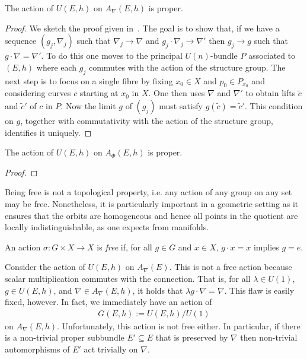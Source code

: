 \documentclass[12pt]{ociamthesis}  %
\begin{document}
\begin{example}\label{ex:h_proper_action}
  The action of $U(E,h)$ on $A_\nabla(E,h)$ is proper.
  \begin{proof}
    We sketch the proof given in~\cite[{Proposition 7.1.14}]{kobayashi1987}.
    The goal is to show that, if we have a sequence $(g_j,\nabla_j)$
    such that $\nabla_j\to\nabla$ and $g_j\cdot\nabla_j\to\nabla'$
    then $g_j\to g$ such that $g\cdot\nabla = \nabla'$. To do this
    one moves to the principal $U(n)$-bundle $P$ associated to $(E,h)$
    where each $g_j$ commutes with the action of the structure
    group. The next step is to focus on a single fibre by fixing $x_0\in X$ and
    $p_0\in P_{x_0}$ and considering curves $c$ starting at $x_0$ in $X$.
    One then uses $\nabla$ and $\nabla'$ to obtain lifts $\tilde c$ and
    $\tilde c'$ of $c$ in $P$. Now the limit $g$ of $(g_j)$ must satisfy
    $g(\tilde c) = \tilde c'$. This condition on $g$, together with
    commutativity with the action of the structure group, identifies it
    uniquely.
  \end{proof}
\end{example}

\begin{example}\label{ex:higgs_proper_action}
  The action of $U(E,h)$ on $A_\Phi (E,h)$ is proper.
  \begin{proof}
    \missingproof
  \end{proof}
\end{example}

Being free is not a topological property, i.e. any action of any group on any
set may be free. Nonetheless, it is particularly important in a geometric
setting as it ensures that the orbits are homogeneous and hence all points in
the quotient are locally indistinguishable, as one expects from manifolds.

\begin{definition}
  An action $\sigma : G\times X\to X$ is \emph{free} if, for all
  $g\in G$ and $x\in X$, $g\cdot x = x$ implies $g = e$.
\end{definition}

\begin{example}\label{ex:not_free}
  Consider the action of $U(E,h)$ on $A_\nabla(E)$. This is not a free action
  because scalar multiplication commutes with the connection. That is,
  for all $\lambda\in U(1)$, $g\in U(E,h)$, and $\nabla\in A_\nabla(E,h)$,
  it holds that $\lambda g\cdot \nabla = \nabla$. This flaw is easily fixed,
  however. In fact, we immediately have an action of
  \begin{align*}
    G(E,h) := U(E,h) / U(1)
  \end{align*}
  on $A_\nabla(E,h)$. Unfortunately, this action is not free either. In particular,
  if there is a non-trivial proper subbundle $E'\subseteq E$ that is preserved
  by $\nabla$ then non-trivial automorphisms of $E'$ act trivially on $\nabla$.
\end{example}
\end{document}
